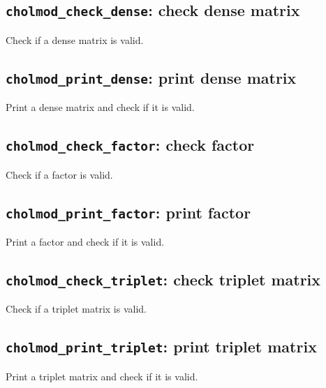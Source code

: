 \documentclass[11pt]{article}
\begin{document}
\subsection{{\tt cholmod\_check\_dense}: check dense matrix}


Check if a dense matrix is valid.

\subsection{{\tt cholmod\_print\_dense}: print dense matrix}


Print a dense matrix and check if it is valid.

\subsection{{\tt cholmod\_check\_factor}: check factor}


Check if a factor is valid.

\subsection{{\tt cholmod\_print\_factor}: print factor}


Print a factor and check if it is valid.

\subsection{{\tt cholmod\_check\_triplet}: check triplet matrix}


Check if a triplet matrix is valid.

\subsection{{\tt cholmod\_print\_triplet}: print triplet matrix}


Print a triplet matrix and check if it is valid.
\end{document}
